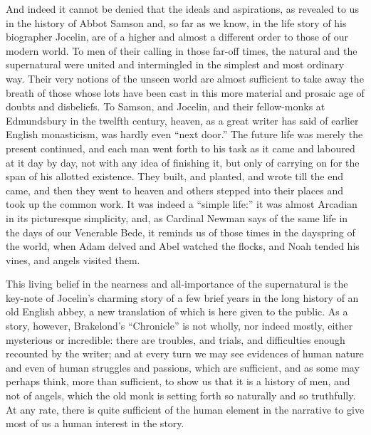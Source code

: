 \documentclass[10pt]{book}
\begin{document}
{{{And indeed it cannot be denied that the ideals and aspirations, as revealed to us in the history of Abbot Samson and, so far as we know, in the life story of his biographer Jocelin, are of a higher and almost a different order to those of our modern world. To men of their calling in those far-off times, the natural and the supernatural were united and intermingled in the simplest and most ordinary way. Their very notions of the unseen world are almost sufficient to take away the breath of those whose lots have been cast in this more material and prosaic age of doubts and disbeliefs. To Samson, and Jocelin, and their fellow-monks at Edmundsbury in the twelfth century, heaven, as a great writer has said of earlier English monasticism, was hardly even ``next door.'' The future life was merely the present continued, and each man went forth to his task as it came and laboured at it day by day, not with any idea of finishing it, but only of carrying on for the span of his allotted existence. They built, and planted, and wrote till the end came, and then they went to heaven and others stepped into their places and took up the common work. It was indeed a ``simple life:'' it was almost Arcadian in its picturesque simplicity, and, as Cardinal Newman says of the same life in the days of our Venerable Bede, it reminds us of those times in the dayspring of the world, when Adam delved and Abel watched the flocks, and Noah tended his vines, and angels visited them.

This living belief in the nearness and all-importance of the supernatural is the key-note of Jocelin's charming story of a few brief years in the long history of an old English abbey, a new translation of which is here given to the public. As a story, however, Brakelond's ``Chronicle'' is not wholly, nor indeed mostly, either mysterious or incredible: there are troubles, and trials, and difficulties enough recounted by the writer; and at every turn we may see evidences of human nature and even of human struggles and passions, which are sufficient, and as some may perhaps think, more than sufficient, to show us that it is a history of men, and not of angels, which the old monk is setting forth so naturally and so truthfully. At any rate, there is quite sufficient of the human element in the narrative to give most of us a human interest in the story.

}}}
\end{document}
